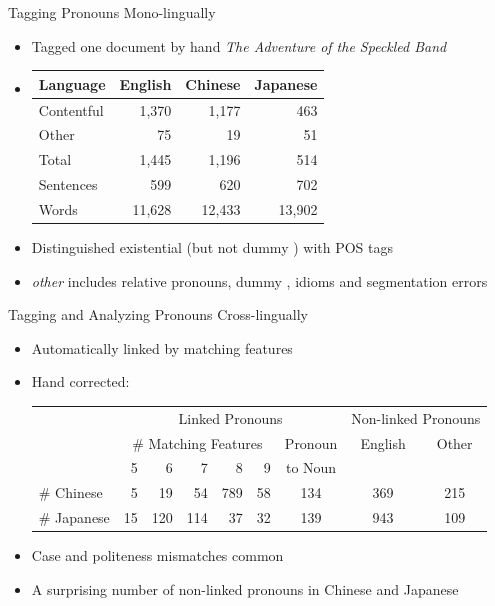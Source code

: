 \documentclass{beamer}
\begin{document}


\begin{frame}{Tagging Pronouns Mono-lingually}
  \begin{itemize}
  \item Tagged one document by hand \textit{The Adventure of the
      Speckled Band}
  \item   
    \begin{tabular}[t]{lrrr}
      Language & English &  Chinese & Japanese \\ \hline
      Contentful & 1,370 & 1,177 & 463 \\
      Other & 75 & 19 & 51\\
      \hline 
      Total &  1,445 & 1,196 & 514
      \\
      \hline 
      Sentences & 599 & 620 & 702 \\
      Words & 11,628 & 12,433 & 13,902 
    \end{tabular}
  \item Distinguished existential  (but not dummy )
    with POS tags
  \item \textit{other} includes relative pronouns, dummy
    , idioms and segmentation errors
  \end{itemize}
\end{frame}

\begin{frame}{Tagging and Analyzing Pronouns Cross-lingually}
  \begin{itemize}
  \item Automatically linked by matching features
  \item Hand corrected:\\
    \hspace*{-2em}
    \begin{tabular}[t]{lrrrrrccc}
      & \multicolumn{6}{c}{Linked Pronouns} & \multicolumn{2}{c}{Non-linked Pronouns} \\
      &\multicolumn{5}{c}{\# Matching Features} & Pronoun & English & Other \\
      & 5 & 6 & 7 & 8 & 9 & to Noun & & \\
      \hline
      \# Chinese   & 5 & 19 & 54 & 789 & 58 & 134 & 369 & 215 \\
      \# Japanese  & 15 & 120 & 114 & 37 & 32 & 139 & 943 & 109
    \end{tabular}
  \item Case and politeness mismatches common
  \item A surprising number of non-linked pronouns in Chinese and Japanese
  \end{itemize}
\end{frame}
\end{document}

